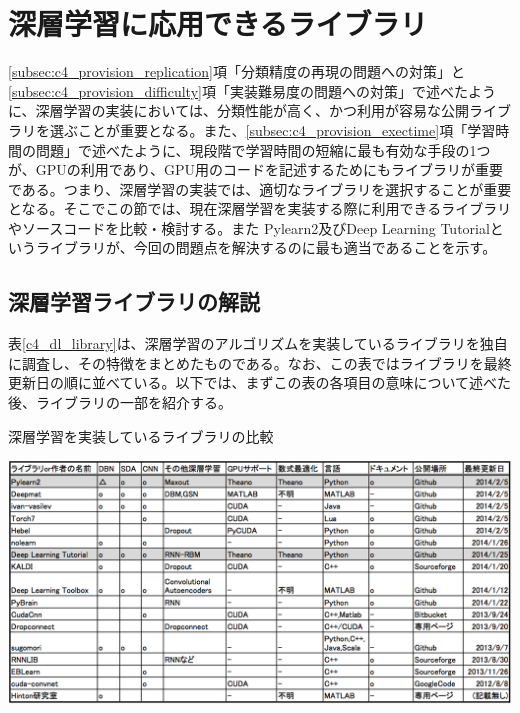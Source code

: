 \section{深層学習に応用できるライブラリ}
\label{sec:c4_deep_library}

\ref{subsec:c4_provision_replication}項「分類精度の再現の問題への対策」と\ref{subsec:c4_provision_difficulty}項「実装難易度の問題への対策」で述べたように、深層学習の実装においては、分類性能が高く、かつ利用が容易な公開ライブラリを選ぶことが重要となる。また、\ref{subsec:c4_provision_exectime}項「学習時間の問題」で述べたように、現段階で学習時間の短縮に最も有効な手段の1つが、GPUの利用であり、GPU用のコードを記述するためにもライブラリが重要である。つまり、深層学習の実装では、適切なライブラリを選択することが重要となる。そこでこの節では、現在深層学習を実装する際に利用できるライブラリやソースコードを比較・検討する。また
Pylearn2及びDeep Learning Tutorialというライブラリが、今回の問題点を解決するのに最も適当であることを示す。

\subsection{深層学習ライブラリの解説}
表\ref{c4_dl_library}は、深層学習のアルゴリズムを実装しているライブラリを独自に調査し、その特徴をまとめたものである。なお、この表ではライブラリを最終更新日の順に並べている。以下では、まずこの表の各項目の意味について述べた後、ライブラリの一部を紹介する。


\begin{table}[tbp]
 \centering
  \caption{深層学習を実装しているライブラリの比較}
  \includegraphics[width=150mm]{img/c4/dl_library}

 \label{c4_dl_library}
\end{table}

